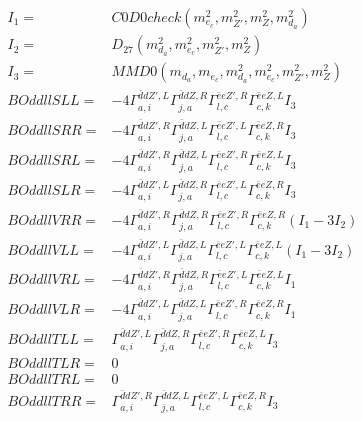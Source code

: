 \documentclass[A4,landscape]{article}
\begin{document}
\begin{align} 
I_1 = & C0D0check(m^2_{e_{{c}}}, m^2_{{Z'}}, m^2_{Z}, m^2_{d_{{a}}}) \\ 
I_2 = & D_{27}(m^2_{d_{{a}}}, m^2_{e_{{c}}}, m^2_{{Z'}}, m^2_{Z}) \\ 
I_3 = & MMD0(m_{d_{{a}}}, m_{e_{{c}}}, m^2_{d_{{a}}}, m^2_{e_{{c}}}, m^2_{{Z'}}, m^2_{Z}) \\ 
  BOddllSLL= & -4  \Gamma^{\bar{d}d {Z'} ,L}_{a, i} \Gamma^{\bar{d}d Z ,R}_{j, a} \Gamma^{\bar{e}e {Z'} ,R}_{l, c} \Gamma^{\bar{e}e Z ,L}_{c, k} I_3 \\ 
  BOddllSRR= & -4  \Gamma^{\bar{d}d {Z'} ,R}_{a, i} \Gamma^{\bar{d}d Z ,L}_{j, a} \Gamma^{\bar{e}e {Z'} ,L}_{l, c} \Gamma^{\bar{e}e Z ,R}_{c, k} I_3 \\ 
  BOddllSRL= & -4  \Gamma^{\bar{d}d {Z'} ,R}_{a, i} \Gamma^{\bar{d}d Z ,L}_{j, a} \Gamma^{\bar{e}e {Z'} ,R}_{l, c} \Gamma^{\bar{e}e Z ,L}_{c, k} I_3 \\ 
  BOddllSLR= & -4  \Gamma^{\bar{d}d {Z'} ,L}_{a, i} \Gamma^{\bar{d}d Z ,R}_{j, a} \Gamma^{\bar{e}e {Z'} ,L}_{l, c} \Gamma^{\bar{e}e Z ,R}_{c, k} I_3 \\ 
  BOddllVRR= & -4  \Gamma^{\bar{d}d {Z'} ,R}_{a, i} \Gamma^{\bar{d}d Z ,R}_{j, a} \Gamma^{\bar{e}e {Z'} ,R}_{l, c} \Gamma^{\bar{e}e Z ,R}_{c, k} (I_1 - 3 I_2) \\ 
  BOddllVLL= & -4  \Gamma^{\bar{d}d {Z'} ,L}_{a, i} \Gamma^{\bar{d}d Z ,L}_{j, a} \Gamma^{\bar{e}e {Z'} ,L}_{l, c} \Gamma^{\bar{e}e Z ,L}_{c, k} (I_1 - 3 I_2) \\ 
  BOddllVRL= & -4  \Gamma^{\bar{d}d {Z'} ,R}_{a, i} \Gamma^{\bar{d}d Z ,R}_{j, a} \Gamma^{\bar{e}e {Z'} ,L}_{l, c} \Gamma^{\bar{e}e Z ,L}_{c, k} I_1 \\ 
  BOddllVLR= & -4  \Gamma^{\bar{d}d {Z'} ,L}_{a, i} \Gamma^{\bar{d}d Z ,L}_{j, a} \Gamma^{\bar{e}e {Z'} ,R}_{l, c} \Gamma^{\bar{e}e Z ,R}_{c, k} I_1 \\ 
  BOddllTLL= &  \Gamma^{\bar{d}d {Z'} ,L}_{a, i} \Gamma^{\bar{d}d Z ,R}_{j, a} \Gamma^{\bar{e}e {Z'} ,R}_{l, c} \Gamma^{\bar{e}e Z ,L}_{c, k} I_3 \\ 
  BOddllTLR= & 0 \\ 
  BOddllTRL= & 0 \\ 
  BOddllTRR= &  \Gamma^{\bar{d}d {Z'} ,R}_{a, i} \Gamma^{\bar{d}d Z ,L}_{j, a} \Gamma^{\bar{e}e {Z'} ,L}_{l, c} \Gamma^{\bar{e}e Z ,R}_{c, k} I_3 \\ 
\end{align} 
\end{document}
